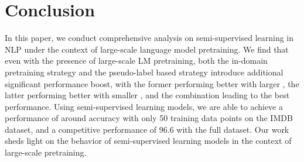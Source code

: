 \documentclass[11pt,a4paper]{article}
\begin{document}
\section{Conclusion}
In this paper, we conduct comprehensive 
analysis on semi-supervised learning in NLP under the context of 
large-scale
language model pretraining. 
We find that even with the presence of large-scale LM pretraining,
both the in-domain pretraining strategy and the pseudo-label based strategy introduce 
additional 
significant performance boost, 
with the former performing better with larger ,  the latter performing better with smaller , and the combination leading to the best performance. 
Using semi-supervised learning models, we are able to achieve a performance of around  accuracy with only 50 training data points on the IMDB dataset, and 
 a competitive performance of 96.6 with the full dataset. 
Our work 
sheds light on 
 the behavior of semi-supervised learning models in the context of large-scale pretraining. 





\end{document}
